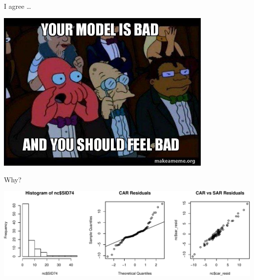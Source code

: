 \documentclass[11pt,ignorenonframetext,]{beamer}
\begin{document}
\begin{frame}{I agree \ldots{}}

\begin{center}
\includegraphics[width=0.8\textwidth]{figs/your-model.jpg}
\end{center}

\end{frame}

\begin{frame}{Why?}

\includegraphics{Lec19_files/figure-beamer/unnamed-chunk-10-1.pdf}

\end{frame}
\end{document}

